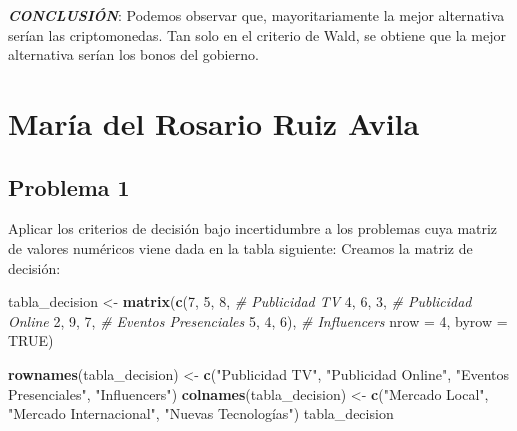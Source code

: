 \documentclass[
]{article}
\newenvironment{Shaded}{\begin{snugshade}}{\end{snugshade}}
\newcommand{\AttributeTok}[1]{\textcolor[rgb]{0.13,0.29,0.53}{#1}}
\newcommand{\CommentTok}[1]{\textcolor[rgb]{0.56,0.35,0.01}{\textit{#1}}}
\newcommand{\ConstantTok}[1]{\textcolor[rgb]{0.56,0.35,0.01}{#1}}
\newcommand{\DecValTok}[1]{\textcolor[rgb]{0.00,0.00,0.81}{#1}}
\newcommand{\FunctionTok}[1]{\textcolor[rgb]{0.13,0.29,0.53}{\textbf{#1}}}
\newcommand{\NormalTok}[1]{#1}
\newcommand{\OtherTok}[1]{\textcolor[rgb]{0.56,0.35,0.01}{#1}}
\newcommand{\StringTok}[1]{\textcolor[rgb]{0.31,0.60,0.02}{#1}}
\begin{document}
\textbf{\emph{CONCLUSIÓN}}: Podemos observar que, mayoritariamente la
mejor alternativa serían las criptomonedas. Tan solo en el criterio de
Wald, se obtiene que la mejor alternativa serían los bonos del gobierno.

\newpage

\section{María del Rosario Ruiz
Avila}\label{maruxeda-del-rosario-ruiz-avila}

\subsection{Problema 1}\label{problema-1-3}

Aplicar los criterios de decisión bajo incertidumbre a los problemas
cuya matriz de valores numéricos viene dada en la tabla siguiente:
Creamos la matriz de decisión:

\begin{Shaded}
\begin{Highlighting}[]
\NormalTok{tabla\_decision }\OtherTok{\textless{}{-}} \FunctionTok{matrix}\NormalTok{(}\FunctionTok{c}\NormalTok{(}\DecValTok{7}\NormalTok{, }\DecValTok{5}\NormalTok{, }\DecValTok{8}\NormalTok{,   }\CommentTok{\# Publicidad TV}
                           \DecValTok{4}\NormalTok{, }\DecValTok{6}\NormalTok{, }\DecValTok{3}\NormalTok{,   }\CommentTok{\# Publicidad Online}
                           \DecValTok{2}\NormalTok{, }\DecValTok{9}\NormalTok{, }\DecValTok{7}\NormalTok{,   }\CommentTok{\# Eventos Presenciales}
                           \DecValTok{5}\NormalTok{, }\DecValTok{4}\NormalTok{, }\DecValTok{6}\NormalTok{),  }\CommentTok{\# Influencers}
                         \AttributeTok{nrow =} \DecValTok{4}\NormalTok{, }\AttributeTok{byrow =} \ConstantTok{TRUE}\NormalTok{)}

\FunctionTok{rownames}\NormalTok{(tabla\_decision) }\OtherTok{\textless{}{-}} \FunctionTok{c}\NormalTok{(}\StringTok{"Publicidad TV"}\NormalTok{, }\StringTok{"Publicidad Online"}\NormalTok{, }\StringTok{"Eventos Presenciales"}\NormalTok{, }\StringTok{"Influencers"}\NormalTok{)}
\FunctionTok{colnames}\NormalTok{(tabla\_decision) }\OtherTok{\textless{}{-}} \FunctionTok{c}\NormalTok{(}\StringTok{"Mercado Local"}\NormalTok{, }\StringTok{"Mercado Internacional"}\NormalTok{, }\StringTok{"Nuevas Tecnologías"}\NormalTok{)}
\NormalTok{tabla\_decision}
\end{Highlighting}
\end{Shaded}
\end{document}

